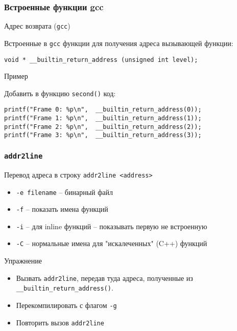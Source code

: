 \begin{frame}[fragile]
	\frametitle{Встроенные функции gcc}

	\begin{block}{Адрес возврата ({\tt gcc})}
		
		Встроенные в {\tt gcc} функции для получения адреса вызывающей функции:

	\begin{lstlisting}
void * __builtin_return_address (unsigned int level);
	\end{lstlisting}
	\end{block}

	\begin{block}{Пример}
	
	Добавить в функцию {\tt second()} код:

	\begin{lstlisting}
printf("Frame 0: %p\n",  __builtin_return_address(0));
printf("Frame 1: %p\n",  __builtin_return_address(1));
printf("Frame 2: %p\n",  __builtin_return_address(2));
printf("Frame 3: %p\n",  __builtin_return_address(3));
	\end{lstlisting}
	\end{block}

\end{frame}

\begin{frame}[fragile]
	\frametitle{{\tt addr2line}}

	\begin{block}{Перевод адреса в строку}
		{\tt addr2line <address>}

		\begin{itemize}
			\item {\tt -e filename} -- бинарный файл
			\item {\tt -f} -- показать имена функций 
			\item {\tt -i} -- для inline функций -- показывать первую не встроенную
			\item {\tt -C} -- нормальные имена для "искалеченных" (C++) функций
		\end{itemize}
	\end{block}

	\begin{block}{Упражнение}

		\begin{itemize}
			\item Вызвать {\tt addr2line}, передав туда адреса, полученные из {\tt \_\_builtin\_return\_address()}.
			\item Перекомпилировать с флагом {\tt -g}
			\item Повторить вызов {\tt addr2line}
		\end{itemize}

	\end{block}

\end{frame}

